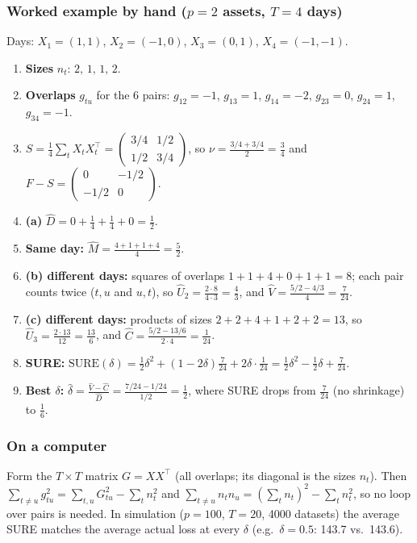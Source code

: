 \documentclass[12pt]{article}
\begin{document}
\subsubsection*{Worked example by hand ($p=2$ assets, $T=4$ days)}
Days: $X_1=(1,1)$, $X_2=(-1,0)$, $X_3=(0,1)$, $X_4=(-1,-1)$.
\begin{enumerate}
\item \textbf{Sizes} $n_t$: $2,\,1,\,1,\,2$.
\item \textbf{Overlaps} $g_{tu}$ for the 6 pairs: $g_{12}=-1$, $g_{13}=1$, $g_{14}=-2$, $g_{23}=0$, $g_{24}=1$, $g_{34}=-1$.
\item $S=\frac14\sum_tX_tX_t^\top=\begin{pmatrix}3/4&1/2\\1/2&3/4\end{pmatrix}$, so $\nu=\frac{3/4+3/4}{2}=\frac34$ and
$F-S=\begin{pmatrix}0&-1/2\\-1/2&0\end{pmatrix}$.
\item \textbf{(a)} $\hat D=0+\tfrac14+\tfrac14+0=\tfrac12$.
\item \textbf{Same day:} $\hat M=\frac{4+1+1+4}{4}=\frac52$.
\item \textbf{(b) different days:} squares of overlaps $1+1+4+0+1+1=8$; each pair counts twice ($t,u$ and
$u,t$), so $\hat U_2=\frac{2\cdot8}{4\cdot3}=\frac43$, and $\hat V=\frac{5/2-4/3}{4}=\frac{7}{24}$.
\item \textbf{(c) different days:} products of sizes $2+2+4+1+2+2=13$, so $\hat U_3=\frac{2\cdot13}{12}=\frac{13}{6}$, and
$\hat C=\frac{5/2-13/6}{2\cdot4}=\frac{1}{24}$.
\item \textbf{SURE:} $\mathrm{SURE}(\delta)=\tfrac12\delta^2+(1-2\delta)\tfrac{7}{24}+2\delta\cdot\tfrac{1}{24}=\tfrac12\delta^2-\tfrac12\delta+\tfrac{7}{24}$.
\item \textbf{Best $\delta$:} $\hat\delta=\frac{\hat V-\hat C}{\hat D}=\frac{7/24-1/24}{1/2}=\frac12$, where SURE drops from $\frac{7}{24}$ (no
shrinkage) to $\frac16$.
\end{enumerate}

\subsubsection*{On a computer}
Form the $T\times T$ matrix $G=XX^\top$ (all overlaps; its diagonal is the sizes $n_t$). Then
$\sum_{t\neq u}g_{tu}^2=\sum_{t,u}G_{tu}^2-\sum_tn_t^2$ and $\sum_{t\neq u}n_tn_u=(\sum_tn_t)^2-\sum_tn_t^2$, so no loop over pairs is
needed. In simulation ($p=100$, $T=20$, 4000 datasets) the average SURE matches the average actual loss
at every $\delta$ (e.g.\ $\delta=0.5$: 143.7 vs.\ 143.6).
\end{document}
